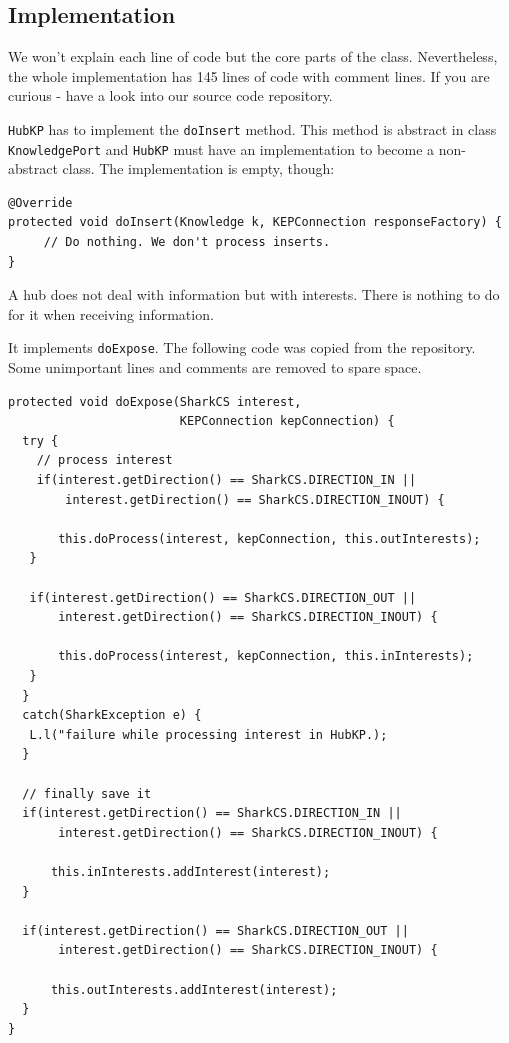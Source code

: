 {\subsection{Implementation} 
We won't explain each line of code but the core parts of the class. Nevertheless, the whole implementation has 145 lines of code with comment lines. 
If you are curious - have a look into our source code repository.

{\tt HubKP} has to implement the {\tt doInsert} method. This method is abstract in class {\tt KnowledgePort} and {\tt HubKP} must have an implementation to become a non-abstract class. The implementation is empty, though:

\begin{verbatim}
@Override
protected void doInsert(Knowledge k, KEPConnection responseFactory) {
     // Do nothing. We don't process inserts.
}
\end{verbatim}

A hub does not deal with information but with interests. There is nothing to do for it when receiving information.

It implements {\tt doExpose}. The following code was copied from
the repository. Some unimportant lines and comments are removed to
spare space.

\begin{verbatim}
protected void doExpose(SharkCS interest, 
                        KEPConnection kepConnection) {
  try {
    // process interest
    if(interest.getDirection() == SharkCS.DIRECTION_IN || 
        interest.getDirection() == SharkCS.DIRECTION_INOUT) {

       this.doProcess(interest, kepConnection, this.outInterests);
   }

   if(interest.getDirection() == SharkCS.DIRECTION_OUT || 
       interest.getDirection() == SharkCS.DIRECTION_INOUT) {

       this.doProcess(interest, kepConnection, this.inInterests);
   }
  }
  catch(SharkException e) {
   L.l("failure while processing interest in HubKP.);
  }

  // finally save it
  if(interest.getDirection() == SharkCS.DIRECTION_IN || 
       interest.getDirection() == SharkCS.DIRECTION_INOUT) {
   
      this.inInterests.addInterest(interest);
  }

  if(interest.getDirection() == SharkCS.DIRECTION_OUT || 
       interest.getDirection() == SharkCS.DIRECTION_INOUT) {
   
      this.outInterests.addInterest(interest);
  }
}
\end{verbatim}

}
